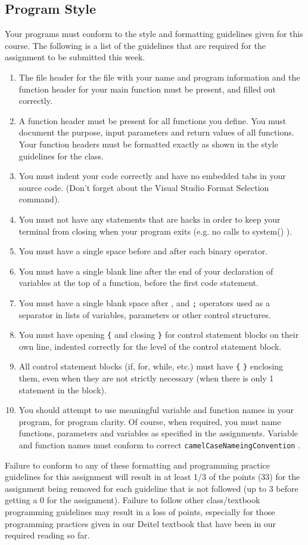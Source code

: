 \documentclass[11pt]{article}
\begin{document}
\subsection*{Program Style}
\label{sec-5-2}


Your programs must conform to the style and formatting guidelines
given for this course.  The following is a list of the guidelines that
are required for the assignment to be submitted this week.

\begin{enumerate}
\item The file header for the file with your name and program information
  and the function header for your main function must be present, and
  filled out correctly.
\item A function header must be present for all functions you define.
   You must document the purpose, input parameters and return values
   of all functions.  Your function headers must be formatted exactly
   as shown in the style guidelines for the class.
\item You must indent your code correctly and have no embedded tabs in
  your source code. (Don't forget about the Visual Studio Format
  Selection command).
\item You must not have any statements that are hacks in order to keep
   your terminal from closing when your program exits (e.g. no calls
   to system() ).
\item You must have a single space before and after each binary operator.
\item You must have a single blank line after the end of your declaration
  of variables at the top of a function, before the first code
  statement.
\item You must have a single blank space after , and \verb~;~ operators used as a
  separator in lists of variables, parameters or other control
  structures.
\item You must have opening \verb~{~ and closing \verb~}~ for control statement blocks
  on their own line, indented correctly for the level of the control
  statement block.
\item All control statement blocks (if, for, while, etc.) must have \verb~{~
   \verb~}~ enclosing them, even when they are not strictly necessary
   (when there is only 1 statement in the block).
\item You should attempt to use meaningful variable and function names in
   your program, for program clarity.  Of course, when required, you
   must name functions, parameters and variables as specified in the
   assignments.  Variable and function names must conform to correct
   \verb~camelCaseNameingConvention~ .
\end{enumerate}

Failure to conform to any of these formatting and programming practice
guidelines for this assignment will result in at least 1/3 of the
points (33) for the assignment being removed for each guideline that
is not followed (up to 3 before getting a 0 for the
assignment). Failure to follow other class/textbook programming
guidelines may result in a loss of points, especially for those
programming practices given in our Deitel textbook that have been in
our required reading so far.
\end{document}
